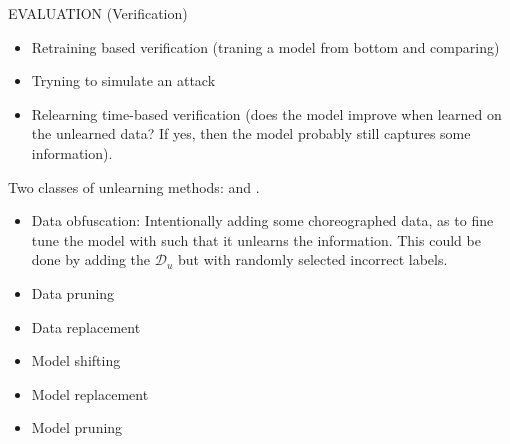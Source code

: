 EVALUATION (Verification)
\begin{itemize}
    \item Retraining based verification (traning a model from bottom and comparing)
    \item Tryning to simulate an attack
    \item Relearning time-based verification (does the model improve when learned on the unlearned data? If yes, then the model probably still captures some information).
\end{itemize}



Two classes of unlearning methods:  and .

\begin{itemize}
    \item Data obfuscation: Intentionally adding some choreographed data, as to fine tune the model with such that it unlearns the information. This could be done by adding the $\mathcal{D}_u$ but with randomly selected incorrect labels.
    \item Data pruning
    \item Data replacement
\end{itemize}

\begin{itemize}
    \item Model shifting
    \item Model replacement 
    \item Model pruning
\end{itemize}



